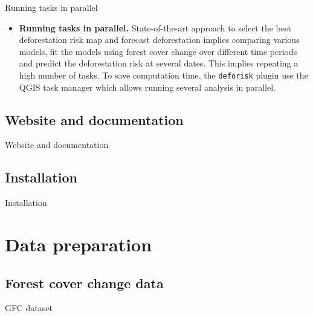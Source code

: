 \documentclass[10pt,table,dvipsnames,compress]{beamer}
\begin{document}
\begin{frame}[label={sec:orgb49bad9},fragile]{Running tasks in parallel}
 \begin{itemize}
\item \textbf{Running tasks in parallel.} State-of-the-art approach to select the best deforestation risk map and forecast deforestation implies comparing various models, fit the models using forest cover change over different time periods and predict the deforestation risk at several dates. This implies repeating a high number of tasks. To save computation time, the \texttt{deforisk} plugin use the QGIS task manager which allows running several analysis in parallel.
\end{itemize}
\end{frame}

\subsection{Website and documentation}
\label{sec:org72981d7}

\begin{frame}[label={sec:org91a1837}]{Website and documentation}
\end{frame}

\subsection{Installation}
\label{sec:org2ce624d}

\begin{frame}[label={sec:org695b58f}]{Installation}
\end{frame}

\section{Data preparation}
\label{sec:orgd689b08}

\subsection{Forest cover change data}
\label{sec:org0f3c058}

\begin{frame}[label={sec:orgb5717aa}]{GFC dataset}
\end{frame}
\end{document}
